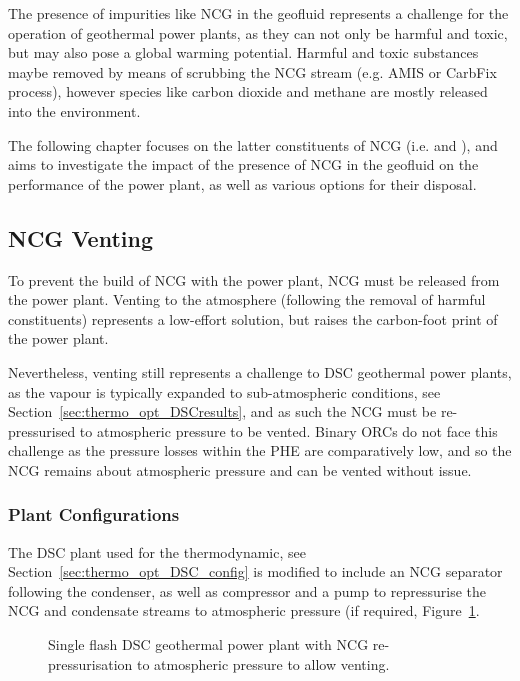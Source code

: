 The presence of impurities like \ac{NCG} in the geofluid represents a challenge for the operation of geothermal power plants, as they can not only be harmful and toxic, but may also pose a global warming potential. Harmful and toxic substances maybe removed by means of scrubbing the \ac{NCG} stream (e.g. AMIS or CarbFix process), however species like carbon dioxide and methane are mostly released into the environment.

The following chapter focuses on the latter constituents of \ac{NCG} (i.e.  and ), and aims to investigate the impact of the presence of \ac{NCG} in the geofluid on the performance of the power plant, as well as various options for their disposal.

\subsection{NCG Venting}
    To prevent the build of \ac{NCG} with the power plant, \ac{NCG} must be released from the power plant. Venting to the atmosphere (following the removal of harmful constituents) represents a low-effort solution, but raises the carbon-foot print of the power plant.

    Nevertheless, venting still represents a challenge to \ac{DSC} geothermal power plants, as the vapour is typically expanded to sub-atmospheric conditions, see Section~\ref{sec:thermo_opt_DSCresults}, and as such the \ac{NCG} must be re-pressurised to atmospheric pressure to be vented. Binary \ac{ORC}s do not face this challenge as the pressure losses within the \ac{PHE} are comparatively low, and so the \ac{NCG} remains about atmospheric pressure and can be vented without issue.

    \subsubsection{Plant Configurations}
        The \ac{DSC} plant used for the thermodynamic, see Section~\ref{sec:thermo_opt_DSC_config} is modified to include an \ac{NCG} separator following the condenser, as well as compressor and a pump to repressurise the \ac{NCG} and condensate streams to atmospheric pressure (if required, Figure~\ref{fig:prosim_NCG_ventingDSC}.

        \begin{figure}[H]
            \centering
            \resizebox{\linewidth}{!}{}
            \caption{Single flash \ac{DSC} geothermal power plant with \ac{NCG} re-pressurisation to atmospheric pressure to allow venting.}
            \label{fig:prosim_NCG_ventingDSC}
        \end{figure}

